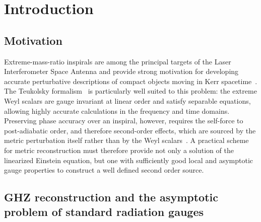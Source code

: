 \documentclass[preprint,aps,nofootinbib,a4paper,superscriptaddress,longbibliography,amsfonts, amssymb,amsmath,titlepage]{revtex4-1}
\numberwithin{equation}{section} %
\newcommand{\newtext}[1]{\textcolor{cyan}{#1}}
\begin{document}
\tableofcontents


\section{Introduction}
\label{sec:introduction}

\subsection{Motivation}\label{sec:motiv}
Extreme-mass-ratio inspirals are among the principal targets of the
Laser Interferometer Space Antenna and provide strong motivation for
developing accurate perturbative descriptions of compact objects moving
in Kerr spacetime~\cite{AmaroSeoane:2012km,Pound:2021qin}.  The Teukolsky
formalism~\cite{Teukolsky:1973ha} is particularly well suited
to this problem: the extreme Weyl scalars are gauge invariant at linear
order and satisfy separable equations, allowing highly accurate
calculations in the frequency and time domains.  Preserving phase accuracy
over an inspiral, however, requires the self-force to post-adiabatic order,
and therefore second-order effects, which are sourced by the metric
perturbation itself rather than by the Weyl scalars~\cite{Pound:2015wva}.
A practical scheme for
metric reconstruction must therefore provide not only a solution of the
linearized Einstein equation, but one with sufficiently good local and
asymptotic gauge properties to construct a well defined second order source.

\subsection{GHZ reconstruction and the asymptotic problem of standard radiation gauges}\label{sec:radiation gauge problem}
\end{document}
